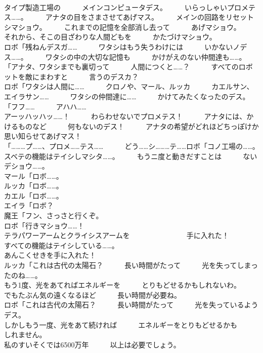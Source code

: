 \documentclass[8pt]{extreport}
\begin{document}
\begin{CJK}{UTF8}{min}
\\	タイプ製造工場の　　　メインコンピュータデス。　　　いらっしゃいプロメテス……。　　　アナタの目をさまさせてあげマス。　　　メインの回路をリセットシマショウ。　　　これまでの記憶を全部消し去って　　　あげマショウ。　　　それから、そこの目ざわりな人間どもを　　　かたづけマショウ。	
\\	ロボ「残ねんデスガ……　　　ワタシはもう失うわけには　　　いかないノデス……。　　　ワタシの中の大切な記憶も　　　かけがえのない仲間達も……。	
\\	「アナタ、ワタシまでも裏切って　　　人間につくと……？　　　すべてのロボットを敵にまわすと　　　言うのデスカ？	
\\	ロボ「ワタシは人間に……　　　クロノや、マール、ルッカ　　　カエルサン、エイラサン……　　　ワタシの仲間達に……　　　かけてみたくなったのデス。	
\\	「フフ……　　　アハハ……	
\\	アーッハッハッ……！　　　わらわせないでプロメテス！　　　アナタには、かけるものなど　　　何もないのデス！　　　アナタの希望がどれほどちっぽけか　　　思い知らせてあげマス！	
\\	「………プ……、プロメ……テス……　　　どう……シ………テ……ロボ「コノ工場の……。　　　スベテの機能はテイシしマシタ……。　　　もうニ度と動きだすことは　　　ないデショウ……。	
\\	マール「ロボ……。	
\\	ルッカ「ロボ……。	
\\	カエル「ロボ……。	
\\	エイラ「ロボ？	
\\	魔王「フン、さっさと行くぞ。	
\\	ロボ「行きマショウ……！	
\\	テラパワーアームとクライシスアームを　　　　　　　　手に入れた！	
\\	すべての機能はテイシしている……。	
\\	あんこくせきを手に入れた！	
\\	ルッカ「これは古代の太陽石？　　　長い時間がたって　　　光を失ってしまったのね……。	
\\	もう1度、光をあてればエネルギーを　　　とりもどせるかもしれないわ。　　　でもたぶん気の遠くなるほど　　　長い時間が必要ね。	
\\	ロボ「これは古代の太陽石？　　　長い時間がたって　　　光を失っているようデス。	
\\	しかしもう一度、光をあて続ければ　　　エネルギーをとりもどせるかも　　　しれません。	
\\	私のすいそくでは6500万年　　　以上は必要でしょう。	

\end{CJK}
\end{document}
